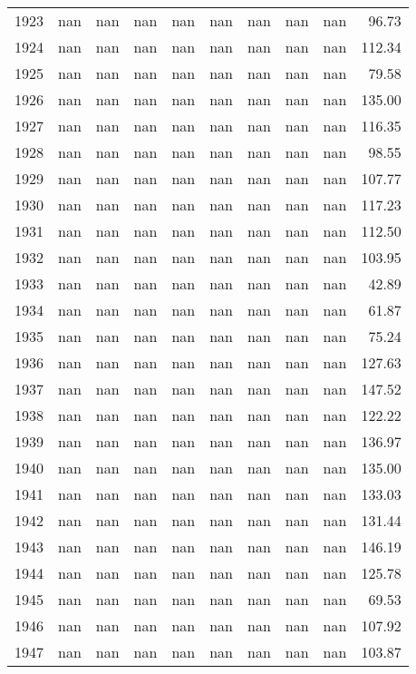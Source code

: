 \begin{tabular}{lrrrrrrrrr}
1923 & nan & nan & nan & nan & nan & nan & nan & nan & 96.73 \\
1924 & nan & nan & nan & nan & nan & nan & nan & nan & 112.34 \\
1925 & nan & nan & nan & nan & nan & nan & nan & nan & 79.58 \\
1926 & nan & nan & nan & nan & nan & nan & nan & nan & 135.00 \\
1927 & nan & nan & nan & nan & nan & nan & nan & nan & 116.35 \\
1928 & nan & nan & nan & nan & nan & nan & nan & nan & 98.55 \\
1929 & nan & nan & nan & nan & nan & nan & nan & nan & 107.77 \\
1930 & nan & nan & nan & nan & nan & nan & nan & nan & 117.23 \\
1931 & nan & nan & nan & nan & nan & nan & nan & nan & 112.50 \\
1932 & nan & nan & nan & nan & nan & nan & nan & nan & 103.95 \\
1933 & nan & nan & nan & nan & nan & nan & nan & nan & 42.89 \\
1934 & nan & nan & nan & nan & nan & nan & nan & nan & 61.87 \\
1935 & nan & nan & nan & nan & nan & nan & nan & nan & 75.24 \\
1936 & nan & nan & nan & nan & nan & nan & nan & nan & 127.63 \\
1937 & nan & nan & nan & nan & nan & nan & nan & nan & 147.52 \\
1938 & nan & nan & nan & nan & nan & nan & nan & nan & 122.22 \\
1939 & nan & nan & nan & nan & nan & nan & nan & nan & 136.97 \\
1940 & nan & nan & nan & nan & nan & nan & nan & nan & 135.00 \\
1941 & nan & nan & nan & nan & nan & nan & nan & nan & 133.03 \\
1942 & nan & nan & nan & nan & nan & nan & nan & nan & 131.44 \\
1943 & nan & nan & nan & nan & nan & nan & nan & nan & 146.19 \\
1944 & nan & nan & nan & nan & nan & nan & nan & nan & 125.78 \\
1945 & nan & nan & nan & nan & nan & nan & nan & nan & 69.53 \\
1946 & nan & nan & nan & nan & nan & nan & nan & nan & 107.92 \\
1947 & nan & nan & nan & nan & nan & nan & nan & nan & 103.87 \\

\end{tabular}
